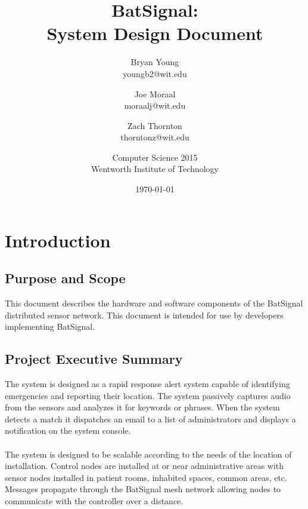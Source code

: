 \documentclass[11pt,a4paper]{article}
\begin{document}
\title{BatSignal:\\System Design Document}
\author{
	Bryan Young\\youngb2@wit.edu \and
	Joe Moraal\\moraalj@wit.edu\\ \and
	Zach Thornton\\thorntonz@wit.edu \and
	Computer Science 2015 \\
	Wentworth Institute of Technology
}
\date{\today}

\maketitle
\newpage

\tableofcontents{}
\newpage


\section{Introduction}

\subsection{Purpose and Scope}
This document describes the hardware and software components of the BatSignal distributed sensor network. This document is intended for use by developers implementing BatSignal.

\subsection{Project Executive Summary}
The system is designed as a rapid response alert system capable of identifying emergencies and reporting their location. The system passively captures audio from the sensors and analyzes it for keywords or phrases. When the system detects a match it dispatches an email to a list of administrators and displays a notification on the system console. \\\\
The system is designed to be scalable according to the needs of the location of installation. Control nodes are installed at or near administrative areas with sensor nodes installed in patient rooms, inhabited spaces, common areas, etc. Messages propagate through the BatSignal mesh network allowing nodes to communicate with the controller over a distance.
\end{document}
